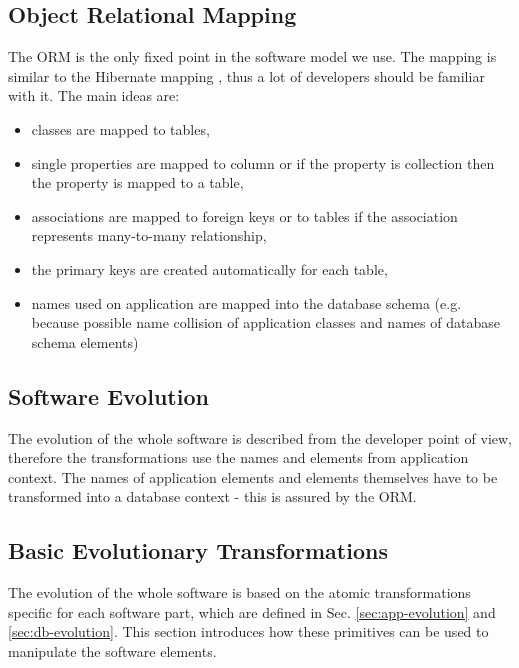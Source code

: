 \documentclass[runningheads]{comsis}
\begin{document}
\subsection{Object Relational Mapping}
The ORM is the only fixed point in the software model we use. The mapping is similar to the Hibernate mapping \cite{Hibernate} , thus a lot of developers should be familiar with it. The main ideas are: 
\begin{itemize}
	\item classes are mapped to tables,
	\item single properties are mapped to column or if the property is collection then the property is mapped to a table,
	\item associations are mapped to foreign keys or to tables if the association represents many-to-many  relationship,
	\item the primary keys are created automatically for each table,
	\item names used on application are mapped into the database schema (e.g. because possible name collision of application classes and names of database schema elements) 
\end{itemize}

\subsection{Software Evolution}
\label{sec:sw-evolution}
The evolution of the whole software is described from the developer point of view, therefore the transformations use the names and elements from application context. The names of application elements and elements themselves have to be transformed into a database context - this is assured by the ORM.

\subsection{Basic Evolutionary Transformations}
\label{sec:sw-basic-evolution}
The evolution of the whole software is based on the atomic transformations specific for each software part, which are defined in Sec. \ref{sec:app-evolution} and \ref{sec:db-evolution}. This section introduces how these primitives can be used to manipulate the software elements.
\end{document}
